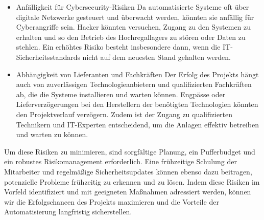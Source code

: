 \begin{itemize}
	\item Anfälligkeit für Cybersecurity-Risiken
	Da automatisierte Systeme oft über digitale Netzwerke gesteuert und überwacht werden, könnten sie anfällig für Cyberangriffe sein. Hacker könnten versuchen, Zugang zu den Systemen zu erhalten und so den Betrieb des Hochregallagers zu stören oder Daten zu stehlen. Ein erhöhtes Risiko besteht insbesondere dann, wenn die IT-Sicherheitsstandards nicht auf dem neuesten Stand gehalten werden.
	\item Abhängigkeit von Lieferanten und Fachkräften
	Der Erfolg des Projekts hängt auch von zuverlässigen Technologieanbietern und qualifizierten Fachkräften ab, die die Systeme installieren und warten können. Engpässe oder Lieferverzögerungen bei den Herstellern der benötigten Technologien könnten den Projektverlauf verzögern. Zudem ist der Zugang zu qualifizierten Technikern und IT-Experten entscheidend, um die Anlagen effektiv betreiben und warten zu können.
\end{itemize}
Um diese Risiken zu minimieren, sind sorgfältige Planung, ein Pufferbudget und ein robustes Risikomanagement erforderlich. Eine frühzeitige Schulung der Mitarbeiter und regelmäßige Sicherheitsupdates können ebenso dazu beitragen, potenzielle Probleme frühzeitig zu erkennen und zu lösen. Indem diese Risiken im Vorfeld identifiziert und mit geeigneten Maßnahmen adressiert werden, können wir die Erfolgschancen des Projekts maximieren und die Vorteile der Automatisierung langfristig sicherstellen.